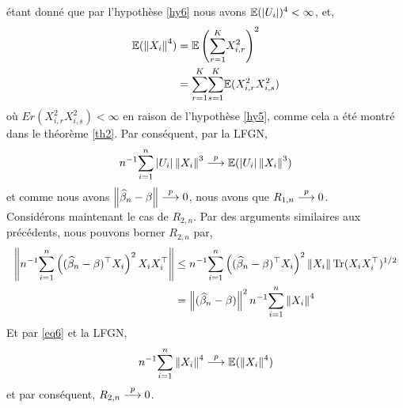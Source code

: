 \documentclass[12pt, reqno]{amsart}
\begin{document}
étant donné que par l'hypothèse \ref{hy6} nous avons $\mathbb{E}(\left\vert {U_i} \right\vert)^4<\infty$, et,
\begin{align}
\mathbb{E}(\left\Vert {X_i} \right\Vert^4) &= \mathbb{E}\left(\underset{r=1}{\overset{K}{\sum}}X_{i, r}^2\right)^2\nonumber\\
&= \underset{r=1}{\overset{K}{\sum}}\underset{s=1}{\overset{K}{\sum}}\mathbb{E}(X_{i, r}^2X_{i, s}^2)
\label{eq6}
\end{align}
où $Er(X_{i, r}^2X_{i, s}^2) < \infty$ en raison de l'hypothèse \ref{hy5}, comme cela a été montré dans le théorème \ref{th2}. Par conséquent, par la LFGN,
\begin{align*}
n^{-1} \underset{i=1}{\overset{n}{\sum}} \left\vert {U_i} \right\vert\left\Vert {X_i} \right\Vert^3 \overset{p}{\longrightarrow} \mathbb{E}(\left\vert {U_i} \right\vert\left\Vert {X_i} \right\Vert^3)
\end{align*}
et comme nous avons $\left\Vert {\widehat{\beta}_n - \beta} \right\Vert \overset{p}{\longrightarrow} 0$, nous avons que $R_{1,n} \overset{p}{\longrightarrow} 0$.\\
Considérons maintenant le cas de $R_{2,n}$. Par des arguments similaires aux précédents, nous pouvons borner $R_{2,n}$ par,
\begin{align*}
\left\Vert {n^{-1} \underset{i=1}{\overset{n}{\sum}}\left((\widehat{\beta}_n-\beta)^\top X_i\right)^2 X_iX_i^\top} \right\Vert &\leq
n^{-1}\underset{i=1}{\overset{n}{\sum}}  \left((\widehat{\beta}_n-\beta)^\top X_i\right)^2 \left\Vert {X_i} \right\Vert\mathrm{Tr}(X_iX_i^\top)^{1/2}\\
&= \left\Vert {(\widehat{\beta}_n-\beta)} \right\Vert^2n^{-1} \underset{i=1}{\overset{n}{\sum}}\left\Vert {X_i} \right\Vert^4
\end{align*}
Et par \eqref{eq6} et la LFGN,
\begin{align*}
n^{-1} \underset{i=1}{\overset{n}{\sum}}\left\Vert {X_i} \right\Vert^4 \overset{p}{\longrightarrow} \mathbb{E}(\left\Vert {X_i} \right\Vert^4)
\end{align*}
et par conséquent, $R_{2,n} \overset{p}{\longrightarrow} 0$.



\end{document}
